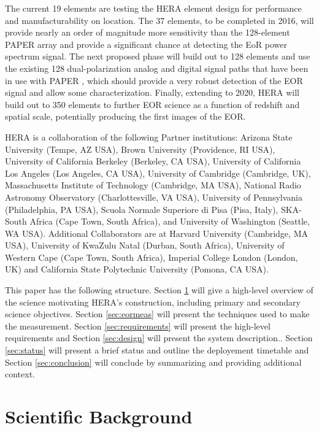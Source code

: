 \documentclass[preprint,11pt]{aastex}
\begin{document}
The current 19 elements are testing the HERA element design for performance and manufacturability on location.  The 37 elements, to be completed in 2016, will provide nearly an order of magnitude more 
sensitivity than the 128-element PAPER array and provide a significant chance at detecting the EoR power spectrum signal.  The next proposed phase will build out to 128 elements and use the existing 128 dual-polarization analog and digital signal paths that have been in use with PAPER \citep{ali_et_al2015}, which should provide a very robust detection of the EOR signal and allow some characterization.  Finally, extending to 2020, HERA will build out to 350 elements to further EOR science as a function 
of redshift and spatial scale, potentially producing the first images of the EOR.

HERA is a collaboration of the following Partner institutions:  
Arizona State University (Tempe, AZ USA), 
Brown University (Providence, RI USA), 
University of California Berkeley (Berkeley, CA USA), 
University of California Los Angeles (Los Angeles, CA USA), 
University of Cambridge (Cambridge, UK), 
Massachusetts Institute of Technology (Cambridge, MA USA), 
National Radio Astronomy Observatory (Charlottesville, VA USA), 
University of Pennsylvania (Philadelphia, PA USA), 
Scuola Normale Superiore di Pisa (Pisa, Italy),
SKA-South Africa (Cape Town, South Africa), and
University of Washington (Seattle, WA USA).  
Additional Collaborators are at 
Harvard University (Cambridge, MA USA),  
University of KwaZulu Natal (Durban, South Africa), 
University of Western Cape (Cape Town, South Africa), 
Imperial College London  (London, UK) and 
California State Polytechnic University (Pomona, CA USA).

This paper has the following structure.  Section \ref{sec:science} will give a high-level overview of the science motivating HERA's construction, including primary and secondary science objectives.  Section \ref{sec:eormeas} will present the techniques used to make the measurement.  Section \ref{sec:requirements} will present the high-level requirements and Section \ref{sec:design} will present the system description..   Section \ref{sec:status} will present a brief status and outline the deployement timetable and Section \ref{sec:conclusion} will conclude by summarizing and providing additional context.

\section{Scientific Background}
\label{sec:science}
\end{document}
